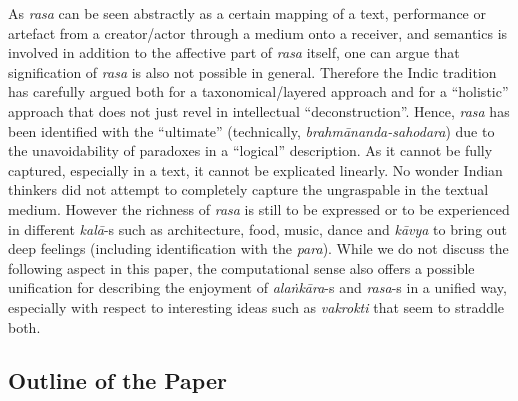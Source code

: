 As \textsl{rasa} can be seen abstractly as a certain mapping of a text, performance or artefact from a creator/actor through a medium onto a receiver, and semantics is involved in addition to the affective part of \textsl{rasa} itself, one can argue that signification of \textsl{rasa} is also not possible in general. Therefore the Indic tradition has carefully argued both for a taxonomical/layered approach and for a “holistic” approach that does not just revel in intellectual “deconstruction”. Hence, \textsl{rasa} has been identified with the “ultimate” (technically, \textsl{brahmānanda-sahodara}) due to the unavoidability of paradoxes in a “logical” description. As it cannot be fully captured, especially in a text, it cannot be explicated linearly. No wonder Indian thinkers did not attempt to completely capture the ungraspable in the textual medium. However the richness of \textsl{rasa} is still to be expressed or to be experienced in different \hbox{\textsl{kalā}-s} such as architecture, food, music, dance and \textsl{kāvya} to bring out deep feelings (including identification with the \textsl{para}). While we do not discuss the following aspect in this paper, the computational sense also offers a possible unification for describing the enjoyment of \textsl{alaṅkāra}-s and \textsl{rasa}-s in a unified way, especially with respect to interesting ideas such as \textsl{vakrokti} that seem to straddle both.\\[-20pt]

\subsection{Outline of the Paper}\label{chap3-sec1.2}

